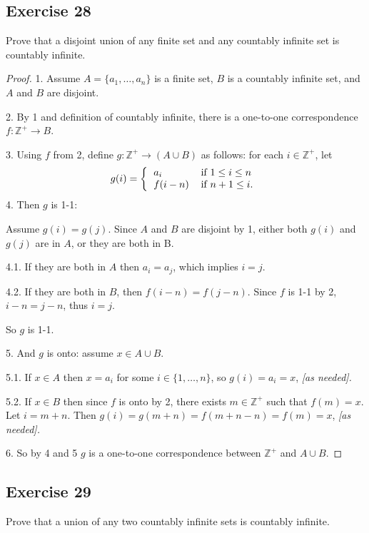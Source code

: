 \documentclass[14pt]{extarticle}
\newcommand{\Z}{\mathbb{Z}}
\begin{document}
\subsection{Exercise 28}
Prove that a disjoint union of any finite set and any countably infinite set is countably infinite.

\begin{proof}
    1. Assume \(A = \{a_1, \ldots, a_n\}\) is a finite set, $B$ is a countably infinite set, and $A$ and $B$ are disjoint.

    2. By 1 and definition of countably infinite, there is a one-to-one correspondence \(f: \Z^+ \to B\).

    3. Using $f$ from 2, define \(g: \Z^+ \to (A \cup B)\) as follows: for each \(i \in \Z^+\), let
    \[
        g(i) =
        \left\{
        \begin{tabular}{ll}
            \(a_i\)      & if \(1 \leq i \leq n\) \\
            \(f(i - n)\) & if \(n+1 \leq i\).
        \end{tabular}
        \right.
    \]
    4. Then $g$ is 1-1:

    Assume \(g(i) = g(j)\). Since $A$ and $B$ are disjoint by 1, either both $g(i)$ and $g(j)$ are in $A$, or they are
    both in B.

    4.1. If they are both in $A$ then \(a_i = a_j\), which implies $i = j$.

    4.2. If they are both in $B$, then \(f(i-n) = f(j-n)\). Since $f$ is 1-1 by 2, \(i-n = j-n\), thus \(i = j\).

    So $g$ is 1-1.

    5. And $g$ is onto: assume \(x \in A \cup B\).

    5.1. If \(x \in A\) then \(x = a_i\) for some \(i \in \{1, \ldots, n\}\), so \(g(i) = a_i = x\), {\it [as needed].}

    5.2. If \(x \in B\) then since $f$ is onto by 2, there exists \(m \in \Z^+\) such that \(f(m)=x\). Let \(i =m+n\).
    Then \(g(i) = g(m+n) = f(m+n-n) = f(m) = x\), {\it [as needed].}

    6. So by 4 and 5 $g$ is a one-to-one correspondence between \(\Z^+\) and \(A \cup B\).
\end{proof}

\subsection{Exercise 29}
Prove that a union of any two countably infinite sets is countably infinite.
\end{document}
